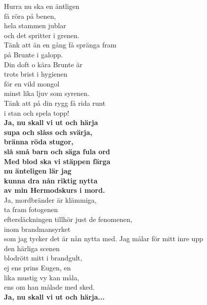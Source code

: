 \documentclass[a6paper, 10pt, twoside]{article}
\begin{document}
\begin{center}
\end{center}
\begin{lyrics}
Hurra nu ska en äntligen \\få röra på benen,\\
hela stammen jublar \\och det spritter i grenen.\\
Tänk att än en gång få spränga fram \\på Brunte i galopp.
\vspace{5pt}\\
Din doft o kära Brunte är \\trots brist i hygienen\\
för en vild mongol\\ minst lika ljuv som syrenen.\\
Tänk att på din rygg få rida runt \\i stan och spela topp! 
\vspace{5pt}\\
\textbf{Ja, nu skall vi ut och härja\\
supa och slåss och svärja,\\
bränna röda stugor,\\
slå små barn och säga fula ord\\
Med blod ska vi stäppen färga\\
nu änteligen lär jag\\
kunna dra nån riktig nytta \\
av min Hermodskurs i mord. }
\vspace{5pt}\\
Ja, mordbränder är klämmiga, \\ta fram fotogenen\\
eftersläckningen tillhör just de fenomenen,\\
inom brandmansyrket \\som jag tycker det är nån nytta med.
\newpage 
\noindent
Jag målar för mitt inre upp \\den härliga scenen\\
blodrött mitt i brandgult, \\ej ens prins Eugen, en\\
lika mustig vy kan måla, \\ens om han målade med sked.
\vspace{5pt}\\
\textbf{Ja, nu skall vi ut och härja...} 
\vspace{5pt}\\

\end{lyrics}
\end{document}
